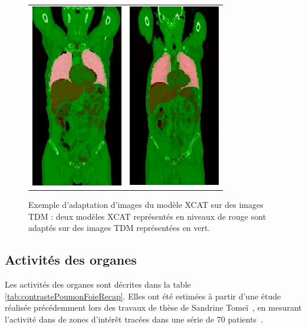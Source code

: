 \begin{figure}
 \centering
 \begin{tabular}{c c}
 \includegraphics[width=4cm]{images/adapt_bru_jea} &
 \includegraphics[width=4cm]{images/adapt_cha_chr}
 \end{tabular}
 \caption[Exemple d’adaptation d’images du modèle XCAT sur des images TDM]{ Exemple d’adaptation d’images du modèle XCAT sur des images TDM : deux modèles XCAT représentés en niveaux de rouge sont adaptés sur des images TDM représentées en vert.}
 \label{fig:adaptXCAT}
\end{figure}


\subsection{Activités des organes}

Les activités des organes sont décrites dans la table \ref{tab:contrastePoumonFoieRecap}. Elles ont été estimées à partir d'une étude réalisée précédemment lors des travaux de thèse de Sandrine Tomeï~\cite{tomei2008development}, en mesurant l'activité dans de zones d'intérêt tracées dans une série de 70 patients~\cite{tomei2010oncopet_db}.

